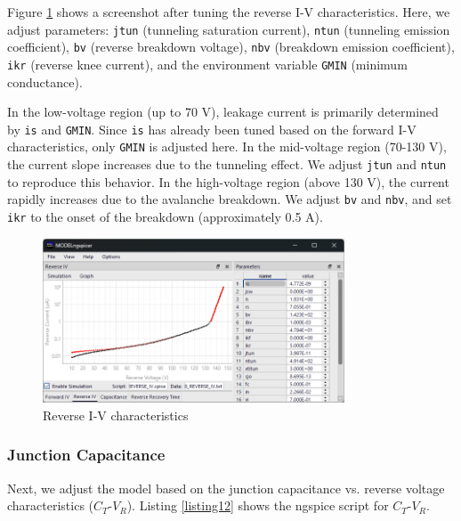 \documentclass[a4paper,12pt,titlepage]{article}
\begin{document}
Figure \ref{fig:img05} shows a screenshot after tuning the reverse I-V characteristics.
Here, we adjust parameters: \texttt{jtun} (tunneling saturation current), \texttt{ntun} (tunneling emission coefficient),
\texttt{bv} (reverse breakdown voltage), \texttt{nbv} (breakdown emission coefficient), \texttt{ikr} (reverse knee current),
and the environment variable \texttt{GMIN} (minimum conductance).

In the low-voltage region (up to 70 V), leakage current is primarily determined by \texttt{is} and \texttt{GMIN}.
Since \texttt{is} has already been tuned based on the forward I-V characteristics, only \texttt{GMIN} is adjusted here.
In the mid-voltage region (70-130 V), the current slope increases due to the tunneling effect.
We adjust \texttt{jtun} and \texttt{ntun} to reproduce this behavior.
In the high-voltage region (above 130 V), the current rapidly increases due to the avalanche breakdown.
We adjust \texttt{bv} and \texttt{nbv}, and set \texttt{ikr} to the onset of the breakdown (approximately 0.5 \mu A).

\begin{figure}[htbp]
    \centering
    \includegraphics[width=0.8\textwidth]{images/img05.png}
    \caption{Reverse I-V characteristics}
    \label{fig:img05}
\end{figure}

\pagebreak

\subsubsection{Junction Capacitance}

Next, we adjust the model based on the junction capacitance vs. reverse voltage characteristics ($C_T$-$V_R$).
Listing \ref{listing12} shows the ngspice script for $C_T$-$V_R$.
\end{document}

